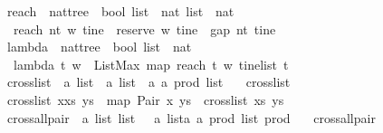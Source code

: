 \begin{isabellebody}
\isanewline
{}\isamarkupfalse%
\ reach\ {\isacharcolon}{\isacharcolon}\ {\isachardoublequoteopen}nattree\ {\isasymRightarrow}\ bool\ list\ {\isasymRightarrow}\ nat\ list\ {\isasymRightarrow}\ nat{\isachardoublequoteclose}\ \isanewline
\ \ {\isachardoublequoteopen}reach\ nt\ w\ tine\ {\isacharequal}\ reserve\ w\ tine\ {\isacharminus}\ gap\ nt\ tine{\isachardoublequoteclose}\isanewline
\ \ \isanewline
\isanewline
\ \ \isanewline
{}\isamarkupfalse%
\ lambda\ {\isacharcolon}{\isacharcolon}\ {\isachardoublequoteopen}nattree\ {\isasymRightarrow}\ bool\ list\ {\isasymRightarrow}\ nat{\isachardoublequoteclose}\ \isanewline
\ \ {\isachardoublequoteopen}lambda\ t\ w\ {\isacharequal}\ ListMax\ {\isacharparenleft}map\ {\isacharparenleft}reach\ t\ w{\isacharparenright}\ {\isacharparenleft}tinelist\ t{\isacharparenright}{\isacharparenright}\ {\isachardoublequoteclose}\isanewline
\isanewline
{}\isamarkupfalse%
\ crosslist\ {\isacharcolon}{\isacharcolon}\ {\isachardoublequoteopen}{\isacharprime}a\ list\ {\isasymRightarrow}\ {\isacharprime}a\ list\ {\isasymRightarrow}\ {\isacharparenleft}{\isacharparenleft}{\isacharprime}a{\isacharcomma}\ {\isacharprime}a{\isacharparenright}\ prod{\isacharparenright}\ list{\isachardoublequoteclose}\ \isanewline
\ \ {\isachardoublequoteopen}crosslist\ {\isacharbrackleft}{\isacharbrackright}\ {\isacharunderscore}\ {\isacharequal}\ {\isacharbrackleft}{\isacharbrackright}{\isachardoublequoteclose}\isanewline
{\isacharbar}\ {\isachardoublequoteopen}crosslist\ {\isacharparenleft}x{\isacharhash}xs{\isacharparenright}\ ys\ {\isacharequal}\ {\isacharparenleft}map\ {\isacharparenleft}Pair\ x{\isacharparenright}\ ys{\isacharparenright}\ {\isacharat}\ {\isacharparenleft}crosslist\ xs\ ys{\isacharparenright}\ {\isachardoublequoteclose}\isanewline
\isanewline
{}\isamarkupfalse%
\ cross{\isacharunderscore}all{\isacharunderscore}pair{\isacharprime}\ {\isacharcolon}{\isacharcolon}\ {\isachardoublequoteopen}{\isacharparenleft}{\isacharprime}a\ list{\isacharparenright}\ list\ {\isasymRightarrow}\ \ {\isacharparenleft}{\isacharprime}a\ list{\isacharcomma}{\isacharparenleft}{\isacharparenleft}{\isacharprime}a{\isacharcomma}\ {\isacharprime}a{\isacharparenright}\ prod{\isacharparenright}\ list{\isacharparenright}\ prod{\isachardoublequoteclose}\ \isanewline
\ \ {\isachardoublequoteopen}cross{\isacharunderscore}all{\isacharunderscore}pair{\isacharprime}\ {\isacharbrackleft}{\isacharbrackright}\ {\isacharequal}\ {\isacharparenleft}{\isacharbrackleft}{\isacharbrackright}{\isacharcomma}{\isacharbrackleft}{\isacharbrackright}{\isacharparenright}{\isachardoublequoteclose}\isanewline

\end{isabellebody}
